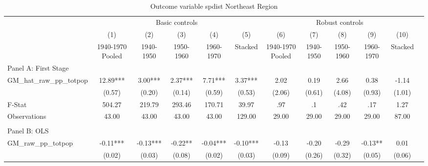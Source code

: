  \begin{table}[htbp]\centering {} \begin{threeparttable} \caption{Outcome variable spdist Northeast Region} \begin{tabular}{l*{11}{c}} \toprule
          &\multicolumn{5}{c}{Basic controls}                                   &\multicolumn{5}{c}{Robust controls}                                  \\\cmidrule(lr){2-6}\cmidrule(lr){7-11}
          &\multicolumn{1}{c}{(1)}&\multicolumn{1}{c}{(2)}&\multicolumn{1}{c}{(3)}&\multicolumn{1}{c}{(4)}&\multicolumn{1}{c}{(5)}&\multicolumn{1}{c}{(6)}&\multicolumn{1}{c}{(7)}&\multicolumn{1}{c}{(8)}&\multicolumn{1}{c}{(9)}&\multicolumn{1}{c}{(10)}\\
          &\multicolumn{1}{c}{1940-1970 Pooled}&\multicolumn{1}{c}{1940-1950}&\multicolumn{1}{c}{1950-1960}&\multicolumn{1}{c}{1960-1970}&\multicolumn{1}{c}{Stacked}&\multicolumn{1}{c}{1940-1970 Pooled}&\multicolumn{1}{c}{1940-1950}&\multicolumn{1}{c}{1950-1960}&\multicolumn{1}{c}{1960-1970}&\multicolumn{1}{c}{Stacked}\\
\cmidrule(lr){1-11}
\multicolumn{10}{l}{Panel A: First Stage}\\
\cmidrule(lr){1-11}
GM\_hat\_raw\_pp\_totpop&     12.89***&      3.00***&      2.37***&      7.71***&      3.37***&      2.02   &      0.19   &      2.66   &      0.38   &     -1.14   \\
          &    (0.57)   &    (0.20)   &    (0.14)   &    (0.59)   &    (0.53)   &    (2.06)   &    (0.61)   &    (4.08)   &    (0.93)   &    (1.01)   \\
\midrule
F-Stat    &    504.27   &    219.79   &    293.46   &    170.71   &     39.97   &       .97   &        .1   &       .42   &       .17   &      1.27   \\
Observations&     43.00   &     43.00   &     43.00   &     43.00   &    129.00   &     29.00   &     29.00   &     29.00   &     29.00   &     87.00   \\
\cmidrule[\heavyrulewidth](lr){1-11} \\ \cmidrule[\heavyrulewidth](lr){1-11}
\multicolumn{10}{l}{Panel B: OLS}\\
\cmidrule(lr){1-11}
GM\_raw\_pp\_totpop&     -0.11***&     -0.13***&     -0.22** &     -0.04***&     -0.10***&     -0.13   &     -0.20   &     -0.29   &     -0.13** &      0.01   \\
          &    (0.02)   &    (0.03)   &    (0.08)   &    (0.02)   &    (0.03)   &    (0.09)   &    (0.26)   &    (0.32)   &    (0.05)   &    (0.06)   \\

\end{tabular}
\end{threeparttable}
\end{table}
